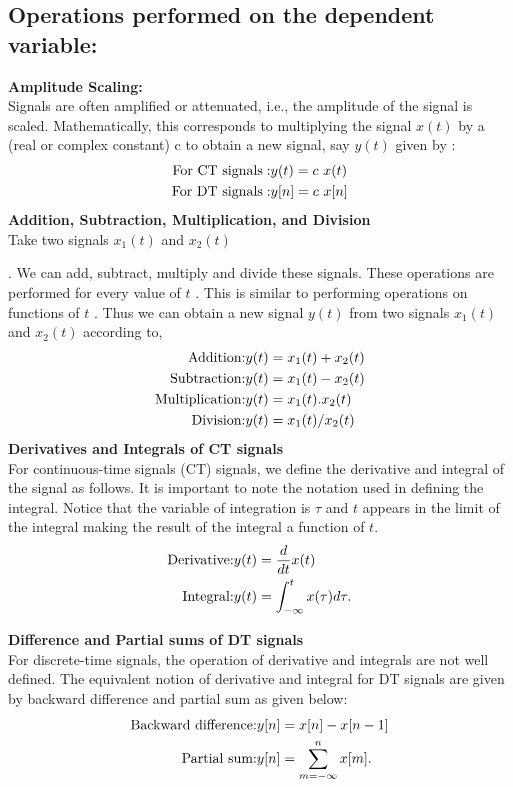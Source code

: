 \documentclass[a4paper,12pt]{book}
\begin{document}
\subsection{Operations performed on the dependent variable:}
{\bf Amplitude Scaling:\\}
Signals are often amplified or attenuated, i.e., the amplitude of the signal is scaled. Mathematically, this corresponds to multiplying the signal $x(t)$ by a (real or complex constant) c to obtain a new signal, say $y(t)$ given by :
\begin{align} \hbox{For CT signals}: & y(t) = c \ x(t) \nonumber \\ \hbox{For DT signals}: & y[n] = c \ x[n] \end{align}
{\bf Addition, Subtraction, Multiplication, and Division\\}
Take two signals 
$x_1(t)$ and $x_2(t)$ 

. We can add, subtract, multiply and divide these signals. These operations are performed for every value of $t$
. This is similar to performing operations on functions of $t$
. Thus we can obtain a new signal 
$y(t)$
from two signals 
$x_1(t)$ and $x_2(t)$ 
according to,
\begin{align} \hbox{Addition:} & y(t)=x_1(t)+x_2(t) \\ \hbox{Subtraction:}& y(t)=x_1(t)-x_2(t) \\ \hbox{Multiplication:}&y(t)=x_1(t).x_2(t) \\ \hbox{Division:}&y(t)=x_1(t)/x_2(t) \end{align}
{\bf Derivatives and Integrals of CT signals\\}
For continuous-time signals (CT) signals, we define the derivative and integral of the signal as follows. It is important to note the notation used in defining the integral. Notice that the variable of integration is $\tau$ and $t$ appears in the limit of the integral making the result of the integral a function of $t$.
\begin{align} \hbox{Derivative:} & y(t)=\frac{d}{dt}x(t) \\ \hbox{Integral:} & y(t)=\int_{-\infty}^{t}x(\tau)d\tau. \end{align}

{\bf Difference and Partial sums of DT signals\\}
For discrete-time signals, the operation of derivative and integrals are not well defined. The equivalent notion of derivative and integral for DT signals are given by backward difference and partial sum as given below:
\begin{align} \hbox{Backward difference:} & y[n]=x[n]-x[n-1] \\ \hbox{Partial sum:} & y[n] = \sum_{m=-\infty}^{n} x[m]. \end{align}
\end{document}

